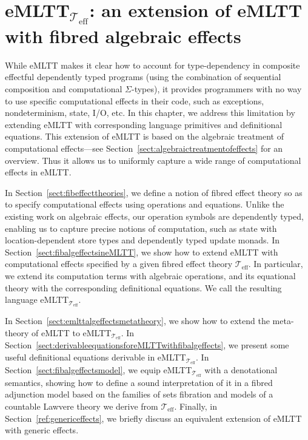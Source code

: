 
\chapter[eMLTT$_{\!\mathcal{T}_{\text{eff}}}$: an extension of eMLTT with fibred algebraic effects]{eMLTT$_{\mathcal{T}_{\text{eff}}}$: an extension of eMLTT \\with fibred algebraic effects}
\label{chap:fibalgeffects}

While eMLTT makes it clear how to account for type-dependency in composite effectful dependently typed programs (using the combination of sequential composition and computational $\Sigma$-types), it  provides programmers with no way to use specific computational effects in their code, such as exceptions, nondeterminism, state, I/O, etc. In this chapter, we address this limitation by extending eMLTT with corresponding language primitives and definitional equations. This extension of eMLTT is based on the algebraic treatment of computational effects---see Section~\ref{sect:algebraictreatmentofeffects} for an overview.  Thus it allows us to uniformly capture a wide range of computational effects in eMLTT.

In Section~\ref{sect:fibeffecttheories}, we define a notion of fibred effect theory so as to specify computational effects using operations and equations. 
Unlike the existing work on algebraic effects, our operation symbols are dependently typed, enabling us to capture precise notions of computation, such as state with location-dependent store types and dependently typed update monads. 
In Section~\ref{sect:fibalgeffectsineMLTT}, we show how to extend eMLTT with computational effects specified by a given fibred effect theory ${\mathcal{T}_{\text{eff}}}$. In particular, we extend its computation terms with algebraic operations, and its equational theory with the corresponding  definitional equations. We call the resulting language eMLTT$_{\mathcal{T}_{\text{eff}}}$. 

In Section~\ref{sect:emlttalgeffectsmetatheory}, we show how to extend the meta-theory of eMLTT to eMLTT$_{\mathcal{T}_{\text{eff}}}$. \linebreak
In Section~\ref{sect:derivableequationsforeMLTTwithfibalgeffects}, we present some useful definitional equations derivable in eMLTT$_{\mathcal{T}_{\text{eff}}}$. In Section~\ref{sect:fibalgeffectsmodel}, we equip eMLTT$_{\mathcal{T}_{\text{eff}}}$ with a denotational semantics,  showing how to define a sound interpretation of it in a fibred adjunction model based on the families of sets fibration and models of a countable Lawvere theory we derive from $\mathcal{T}_{\text{eff}}$. Finally, in Section~\ref{ref:genericeffects}, we briefly discuss an equivalent extension of eMLTT with generic effects.


